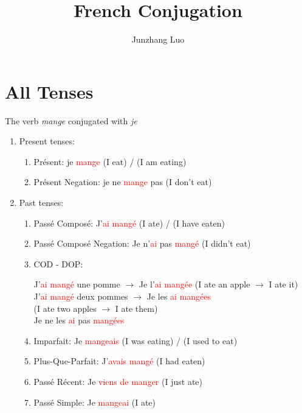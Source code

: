 \documentclass{book}
\title{French Conjugation}
\author{Junzhang Luo}
\begin{document}
\tableofcontents

\chapter{All Tenses}
The verb \textit{mange} conjugated with \textit{je} 
    \begin{enumerate}
        \item Present tenses:
            \begin{enumerate}
                \item Présent: je \textcolor{red}{mange} (I eat) / (I am eating)
                \item Présent Negation: je ne \textcolor{red}{mange} pas (I don't eat)
            \end{enumerate}
        
        \item Past tenses:
            \begin{enumerate}
                \item Passé Composé: J'\textcolor{red}{ai mangé} (I ate) / (I have eaten)
                \item Passé Composé Negation: Je n'\textcolor{red}{ai} pas  \textcolor{red}{mangé} (I didn't eat)
                \item COD - DOP: 
                    \begin{center}
                        J'\textcolor{red}{ai mangé} une pomme $\rightarrow$ Je l'\textcolor{red}{ai mangée} (I ate an apple $\rightarrow$ I ate it) \\
                        J'\textcolor{red}{ai mangé} deux pommes $\rightarrow$ Je les \textcolor{red}{ai mangées} \\
                        (I ate two apples $\rightarrow$ I ate them) \\
                        Je ne les \textcolor{red}{ai} pas \textcolor{red}{mangées}
                    \end{center}
                \item Imparfait: Je \textcolor{red}{mangeais} (I was eating) / (I used to eat)
                \item Plus-Que-Parfait: J'\textcolor{red}{avais mangé} (I had eaten)
                \item Passé Récent: Je \textcolor{red}{viens de manger} (I just ate)
                \item Passé Simple: Je \textcolor{red}{mangeai} (I ate)
            \end{enumerate}
        

\end{enumerate}
\end{document}
